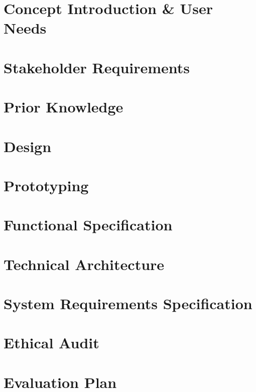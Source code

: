 \documentclass[12pt]{report}
\begin{document}

\chapter{Concept Introduction \& User Needs}


\chapter{Stakeholder Requirements}


\chapter{Prior Knowledge}


\chapter{Design}


\chapter{Prototyping}


\chapter{Functional Specification}


\chapter{Technical Architecture}


\chapter{System Requirements Specification}


\chapter{Ethical Audit}


\chapter{Evaluation Plan}

\end{document}
